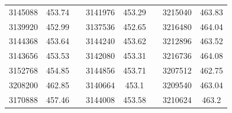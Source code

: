 \documentclass[12pt]{mwart}
\begin{document}
\begin{table}[H]
\begin{tabular}{cclcclcc}
		3145088                                                  & 453.74                                                        &  & 3141976                                                  & 453.29                                                        &  & 3215040                                                  & 463.83                                                        \\
		3139920                                                  & 452.99                                                        &  & 3137536                                                  & 452.65                                                        &  & 3216480                                                  & 464.04                                                        \\
		3144368                                                  & 453.64                                                        &  & 3144240                                                  & 453.62                                                        &  & 3212896                                                  & 463.52                                                        \\
		3143656                                                  & 453.53                                                        &  & 3142080                                                  & 453.31                                                        &  & 3216736                                                  & 464.08                                                        \\
		3152768                                                  & 454.85                                                        &  & 3144856                                                  & 453.71                                                        &  & 3207512                                                  & 462.75                                                        \\
		3208200                                                  & 462.85                                                        &  & 3140664                                                  & 453.1                                                         &  & 3209540                                                  & 463.04                                                        \\
		3170888                                                  & 457.46                                                        &  & 3144008                                                  & 453.58                                                        &  & 3210624                                                  & 463.2                                                         \\

\end{tabular}
\end{table}
\end{document}
